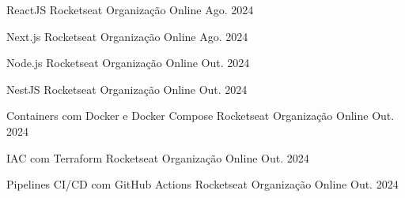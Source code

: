 

\begin{cvhonors}

  \cvhonor
    {ReactJS} %
    {Rocketseat} %
    {Organização Online} %
    {Ago. 2024} %

  \cvhonor
    {Next.js} %
    {Rocketseat} %
    {Organização Online} %
    {Ago. 2024} %

  \cvhonor
    {Node.js} %
    {Rocketseat} %
    {Organização Online} %
    {Out. 2024} %

  \cvhonor
    {NestJS} %
    {Rocketseat} %
    {Organização Online} %
    {Out. 2024} %

  \cvhonor
    {Containers com Docker e Docker Compose} %
    {Rocketseat} %
    {Organização Online} %
    {Out. 2024} %

  \cvhonor
    {IAC com Terraform} %
    {Rocketseat} %
    {Organização Online} %
    {Out. 2024} %

  \cvhonor
    {Pipelines CI/CD com GitHub Actions} %
    {Rocketseat} %
    {Organização Online} %
    {Out. 2024} %

\end{cvhonors}
